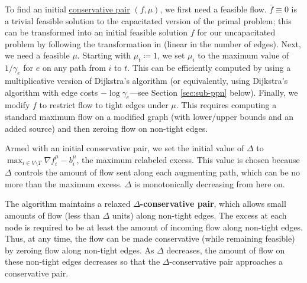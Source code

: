 \documentclass[11pt]{article}
\makeatletter
\let\comment\todo
\newcommand{\katie}[1]{\comment[nolist,color=green!40]{@katie\\ #1}}
\theoremstyle{definition}
\theoremstyle{definition}
\theoremstyle{definition}
\newcommand{\fu}{f^{\mu}}
\newcommand{\nfiu}{\nabla \fu_i}
\newcommand{\biu}{b_{i}^{\mu}}
\newcommand{\rewrite}[1]{\textcolor{red}{#1}}
\renewcommand{\todo}[1]{\hl{TODO: #1}}
\makeatother
\begin{document}
To find an initial \hyperref[def:conservative]{conservative pair} $(f,\mu)$, we first need a feasible flow.
$\bar{f} \equiv 0$ is a trivial
feasible solution to the capacitated version of the primal problem; this can be transformed
into an initial feasible solution $f$ for our uncapacitated problem by
following the transformation in \cite{article} (linear in the number of edges).
Next, we need a feasible $\mu$. Starting with 
$\mu_t \coloneqq 1$, we set $\mu_i$ to the maximum value of $1/\gamma_e$ for $e$ on any path
from $i$ to $t$. This can be efficiently computed by using a multiplicative version
of Dijkstra's algorithm (or equivalently, using Dijkstra's algorithm with edge
costs $-\log \gamma_e$---see Section \ref{sec:sub-ppn} below).
Finally, we modify $f$ to restrict flow to tight edges under $\mu$.
This requires computing a standard maximum flow on a modified graph
(with lower/upper bounds and an added source)
and then zeroing flow on non-tight edges.

Armed with an initial conservative pair, we set the initial value of $\Delta$ to
$\max_{i \in V\setminus T} \nfiu-\biu$, the maximum relabeled excess.
This value is chosen because $\Delta$ controls the
amount of flow sent along each augmenting path, which can be no more than
the maximum excess. $\Delta$ is monotonically
decreasing from here on.

The algorithm maintains a relaxed \textbf{$\Delta$-conservative pair},
which allows small amounts of flow (less than $\Delta$ units) along non-tight
edges.
The excess at each node is required to be at least the amount of incoming flow along non-tight edges. Thus, at any time, the flow can be made conservative (while remaining feasible) by zeroing flow along non-tight edges.
As $\Delta$ decreases, the amount of flow on these non-tight
edges decreases so that the $\Delta$-conservative pair approaches a conservative pair.
\end{document}

